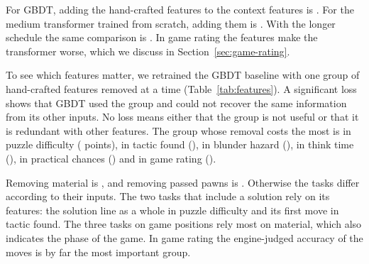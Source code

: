 \documentclass[11pt]{article}
\begin{document}
For GBDT, adding the hand-crafted features to the context features is
. For the medium transformer trained
from scratch, adding them is .
With the longer schedule the same comparison is
. In game rating the
features make the transformer worse, which we discuss in
Section~\ref{sec:game-rating}.

To see which features matter, we retrained the GBDT baseline with one group
of hand-crafted features removed at a time (Table~\ref{tab:features}). A
significant loss shows that GBDT used the group and could not recover the
same information from its other inputs. No loss means either that the group
is not useful or that it is redundant with other features. The group whose
removal costs the most is 
in puzzle difficulty (
points),  in tactic found
(),
 in blunder hazard
(),
 in think time
(),
 in practical chances
() and
 in game rating
().

\begin{table}[htbp]\centering\small
{}
\caption{Feature-group ablation of the GBDT baseline. Each cell is the paired
gain of the model without the group over the model with it, in points of
normalised score: a negative value means the model is worse without the
group, and bold marks a statistically significant difference. An empty cell
means the task's features do not include the group.}
\label{tab:features}
\end{table}

Removing material is , and removing passed
pawns is . Otherwise the tasks differ according
to their inputs. The two tasks that include a solution rely on its features:
the solution line as a whole in puzzle difficulty and its first move in
tactic found. The three tasks on game positions rely most on material, which
also indicates the phase of the game. In game rating the engine-judged
accuracy of the moves is by far the most important group.
\end{document}
